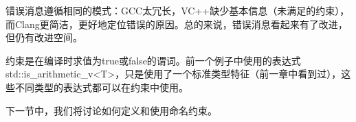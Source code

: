 错误消息遵循相同的模式：GCC太冗长，VC++缺少基本信息（未满足的约束），而Clang更简洁，更好地定位错误的原因。总的来说，错误消息看起来有了改进，但仍有改进空间。

约束是在编译时求值为true或false的谓词。前一个例子中使用的表达式std::is_arithmetic_v<T>，只是使用了一个标准类型特征（前一章中看到过），这些不同类型的表达式都可以在约束中使用。

下一节中，我们将讨论如何定义和使用命名约束。
























